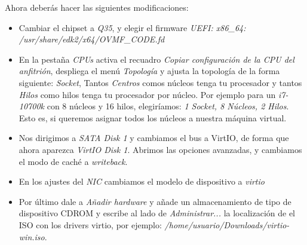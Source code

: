 \documentclass[12pt]{article}
\begin{document}
Ahora deberás hacer las siguientes modificaciones:

\begin{itemize}
\setlength\itemsep{-0.3em}
\item Cambiar el chipset a \emph{Q35}, y elegir el firmware \emph{UEFI: x86\_64: /usr/share/edk2/x64/OVMF\_CODE.fd}
\item En la pestaña \emph{CPUs} activa el recuadro \emph{Copiar configuración de la CPU del anfitrión}, despliega el menú \emph{Topología} y ajusta la topología de la forma siguiente:
 \emph{Socket}, Tantos \emph{Centros} comos núcleos tenga tu procesador y tantos \emph{Hilos} como hilos tenga tu procesador por núcleo. Por ejemplo para un \emph{i7-10700k} con 8 núcleos y 16 hilos, elegiríamos: \emph{1 Socket, 8 Núcleos, 2 Hilos}. Esto es, si queremos asignar todos los núcleos a nuestra máquina virtual.
\item Nos dirigimos a \emph{SATA Disk 1} y cambiamos el bus a VirtIO, de forma que ahora aparezca \emph{VirtIO Disk 1}. Abrimos las opciones avanzadas, y cambiamos el modo de caché a \emph{writeback}.
\item En los ajustes del \emph{NIC} cambiamos el modelo de dispositivo a \emph{virtio}
\item Por último dale a \emph{Añadir hardware} y añade un almacenamiento de tipo de dispositivo CDROM y escribe al lado de \emph{Administrar...} la localización de el ISO con los drivers virtio, por ejemplo: \emph{/home/usuario/Downloads/virtio-win.iso}.
\end{itemize}
\end{document}
